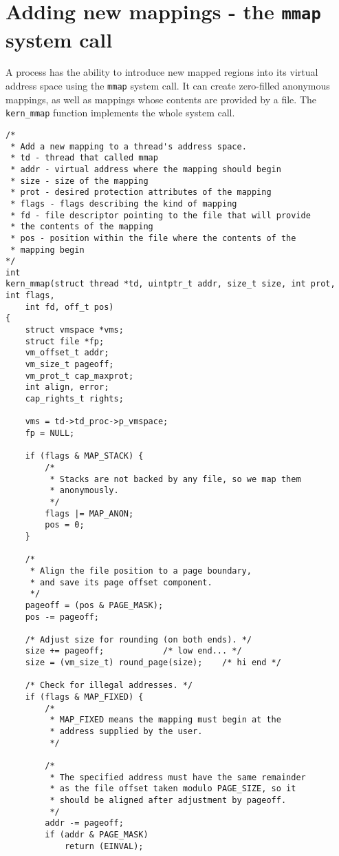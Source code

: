 \documentclass[shortabstract, english]{iithesis}
\newenvironment{code}{}{}
\begin{document}
\section{Adding new mappings - the \texttt{mmap} system call}

A process has the ability to introduce new mapped regions into its virtual
address space using the \texttt{mmap} system call. It can create zero-filled
anonymous mappings, as well as mappings whose contents are provided by a file.
The \texttt{kern_mmap} function implements the whole system call.

\begin{code}
\begin{verbatim}
/*
 * Add a new mapping to a thread's address space.
 * td - thread that called mmap
 * addr - virtual address where the mapping should begin
 * size - size of the mapping
 * prot - desired protection attributes of the mapping
 * flags - flags describing the kind of mapping
 * fd - file descriptor pointing to the file that will provide
 * the contents of the mapping
 * pos - position within the file where the contents of the
 * mapping begin
*/
int
kern_mmap(struct thread *td, uintptr_t addr, size_t size, int prot, int flags,
    int fd, off_t pos)
{
    struct vmspace *vms;
    struct file *fp;
    vm_offset_t addr;
    vm_size_t pageoff;
    vm_prot_t cap_maxprot;
    int align, error;
    cap_rights_t rights;

    vms = td->td_proc->p_vmspace;
    fp = NULL;

    if (flags & MAP_STACK) {
        /*
         * Stacks are not backed by any file, so we map them
         * anonymously.
         */
        flags |= MAP_ANON;
        pos = 0;
    }

    /*
     * Align the file position to a page boundary,
     * and save its page offset component.
     */
    pageoff = (pos & PAGE_MASK);
    pos -= pageoff;

    /* Adjust size for rounding (on both ends). */
    size += pageoff;            /* low end... */
    size = (vm_size_t) round_page(size);    /* hi end */

    /* Check for illegal addresses. */
    if (flags & MAP_FIXED) {
        /*
         * MAP_FIXED means the mapping must begin at the
         * address supplied by the user.
         */

        /*
         * The specified address must have the same remainder
         * as the file offset taken modulo PAGE_SIZE, so it
         * should be aligned after adjustment by pageoff.
         */
        addr -= pageoff;
        if (addr & PAGE_MASK)
            return (EINVAL);


\end{verbatim}
\end{code}
\end{document}
